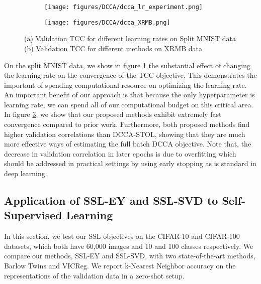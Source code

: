 \begin{figure}
     \centering
     \begin{subfigure}[b]{0.49\textwidth}
         \centering
         \texttt{[image: figures/DCCA/dcca\_lr\_experiment.png]}
         \caption{}
         \label{fig:lrexp}
     \end{subfigure}
     \hfill
     \begin{subfigure}[b]{0.49\textwidth}
         \centering
         \texttt{[image: figures/DCCA/dcca\_XRMB.png]}
         \caption{}
                 \label{fig:xrmb}
     \end{subfigure}
        \caption{ (a) Validation TCC for different learning rates on Split MNIST data (b) Validation TCC for different methods on XRMB data}

\end{figure}

On the split MNIST data, we show in figure \ref{fig:lrexp} the substantial effect of changing the learning rate on the convergence of the TCC objective. This demonstrates the important of spending computational resource on optimizing the learning rate. An important benefit of our approach is that because the only hyperparameter is learning rate, we can spend all of our computational budget on this critical area. In figure \ref{fig:xrmb}, we show that our proposed methods exhibit extremely fast convergence compared to prior work. Furthermore, both proposed methods find higher validation correlations than DCCA-STOL, showing that they are much more effective ways of estimating the full batch DCCA objective. Note that, the decrease in validation correlation in later epochs is due to overfitting which should be addressed in practical settings by using early stopping as is standard in deep learning.

\subsection{Application of SSL-EY and SSL-SVD to Self-Supervised Learning}

In this section, we test our SSL objectives on the CIFAR-10 and CIFAR-100 datasets, which both have 60,000 images and 10 and 100 classes respectively. We compare our methods, SSL-EY and SSL-SVD, with two state-of-the-art methods, Barlow Twins and VICReg. We report k-Nearest Neighbor accuracy on the representations of the validation data in a zero-shot setup.

